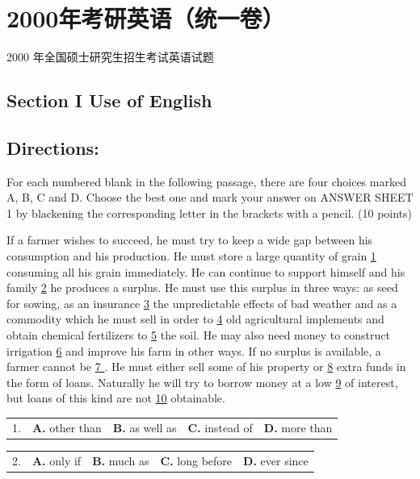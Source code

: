 \documentclass[UTF8,11pt]{ctexart}
\begin{document}
\section*{2000年考研英语（统一卷）}
2000 年全国硕士研究生招生考试英语试题


\subsection*{\textbf{Section I Use of English}}


\subsection*{\textbf{Directions:}}


For each numbered blank in the following passage, there are four choices marked A, B, C and D. Choose the best one and mark your answer on ANSWER SHEET 1 by blackening the corresponding letter in the brackets with a pencil. (10 points)


If a farmer wishes to succeed, he must try to keep a wide gap between his consumption and his production. He must store a large quantity of grain \uline{1} consuming all his grain immediately. He can continue to support himself and his family \uline{2} he produces a surplus. He must use this surplus in three ways: as seed for sowing, as an insurance \uline{3} the unpredictable effects of bad weather and as a commodity which he must sell in order to \uline{4} old agricultural implements and obtain chemical fertilizers to \uline{5} the soil. He may also need money to construct irrigation \uline{6} and improve his farm in other ways. If no surplus is available, a farmer cannot be \uline{7 }. He must either sell some of his property or \uline{8} extra funds in the form of loans. Naturally he will try to borrow money at a low \uline{9} of interest, but loans of this kind are not \uline{10} obtainable.


\noindent\begin{tabularx}{\linewidth}{@{}lXXXX@{}}1. & \textbf{A.} other than & \textbf{B.} as well as & \textbf{C.} instead of & \textbf{D.} more than\\\end{tabularx}\par

\noindent\begin{tabularx}{\linewidth}{@{}lXXXX@{}}2. & \textbf{A.} only if & \textbf{B.} much as & \textbf{C.} long before & \textbf{D.} ever since\\\end{tabularx}\par
\end{document}
